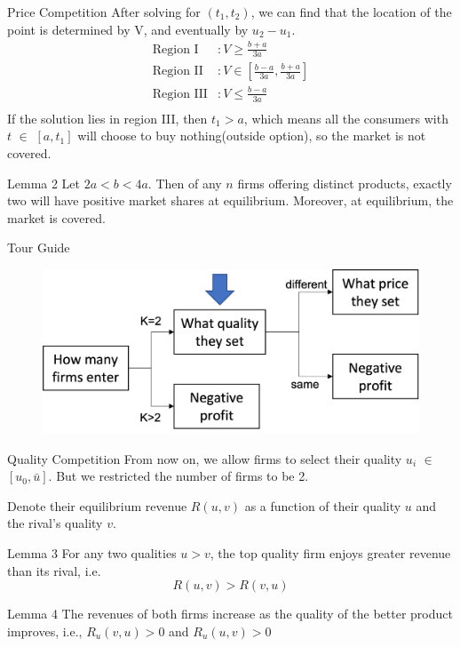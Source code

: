 \documentclass[10pt]{beamer}
\begin{document}
\begin{frame}{Price Competition}
After solving for $(t_1,t_2)$, we can find that the location of the point is determined by V, and eventually by $u_2 - u_1$. 
\begin{equation}
    \begin{split}
        \text{Region I}   &: V \geq \frac{b+a}{3a} \\
        \text{Region II}  &: V \in [\frac{b-a}{3a}, \frac{b+a}{3a}] \\
        \text{Region III} &: V \leq \frac{b-a}{3a} \\
    \end{split}
\end{equation}
If the solution lies in region III, then $t_1 > a$, which means all the consumers with $t$ $\in$ $[a, t_1]$ will choose to buy nothing(outside option), so the market is not covered.
\pause
{}\begin{block}{Lemma 2}
Let $2a < b < 4a$. Then of any $n$ firms offering distinct products, exactly two will have positive market shares at equilibrium. Moreover, at equilibrium, the market is covered.
\end{block}
\end{frame}

\begin{frame}{Tour Guide}
\begin{figure}
    \centering
    \includegraphics[width = .9\textwidth]{guide2.png}

\end{figure}
\end{frame}

\begin{frame}{Quality Competition}
From now on, we allow firms to select their quality $u_i$ $\in$ $[u_0, \bar{u}]$. But we restricted the number of firms to be 2.

Denote their equilibrium revenue $R(u,v)$ as a function of their quality $u$ and the rival's quality $v$.

\begin{block}{Lemma 3}
For any two qualities $u > v$, the top quality firm enjoys greater revenue than its rival, i.e.
\begin{equation}
    R(u,v) > R(v, u)
\end{equation}
\end{block}

\begin{block}{Lemma 4}
The revenues of both firms increase as the quality of the better product improves, i.e., $ R_u(v,u) > 0$ and $R_u(u,v) > 0$
\end{block}
\end{frame}
\end{document}
